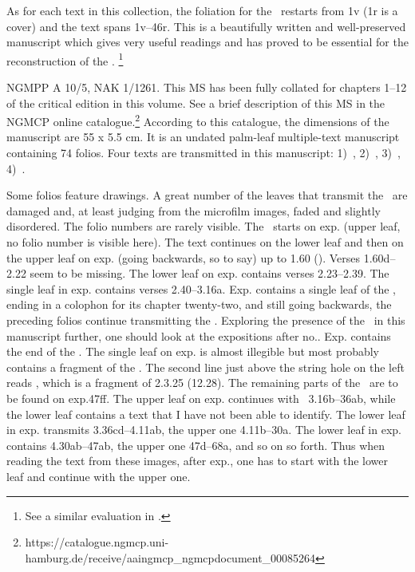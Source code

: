 As for each text in this collection, the foliation for the
\VSS\ restarts from \fol1v (\fol1r is a cover) and the text
spans \fols1v--46r. This is a beautifully written and well-preserved
manuscript which gives very useful readings and has proved to be
essential for the reconstruction of the \VSS.%
	\footnote{See a similar evaluation in
					.}


NGMPP A 10/5, NAK 1/1261. This MS has been fully collated 
for chapters 1--12 of the critical edition in this volume. 
See a brief description of this MS in
the NGMCP online catalogue.\footnote{https://catalogue.ngmcp.uni-hamburg.de/receive/aaingmcp\_ngmcpdocument\_00085264}
According to this catalogue, the dimensions of the manuscript are 55 x
5.5 cm. It is an undated palm-leaf multiple-text manuscript containing 74
folios. Four texts are transmitted in this manuscript: 
1)~\SDhU,
2)~\Ums,
3)~\SivaUp,
4)~\Vss.

Some folios feature drawings. 
A great number of the leaves that 
transmit the \VSS\ are damaged and, 
at least judging from the microfilm images, 
faded and slightly disordered. The folio numbers are
rarely visible. The \VSS\ starts on exp. 
(upper leaf, no folio number is visible here). 
The text continues on the lower leaf and then on the upper
leaf on exp. (going backwards, so to say) 
up to 1.60 (). 
Verses 1.60d--2.22 seem to be missing. The lower leaf on
exp. contains verses 2.23--2.39. 
The single leaf in exp. contains
verses 2.40--3.16a. Exp. contains a single leaf of the
, ending in a colophon for its chapter
twenty-two, and still going backwards, the preceding folios continue
transmitting the 
\Ums. 
Exploring the presence of
the \VSS\ in this manuscript further, 
one should look at the expositions
after no.. Exp. contains the end of the
\SivaUp. The
single leaf on exp. 
is almost illegible but most probably contains a
fragment of the 
. 
The second line just above
the string hole on the left reads  , which is a fragment of
2.3.25 (12.28). 
The remaining parts of the \VSS\
are to be found on exp.ff. 
The upper leaf on exp.\thinspace47 continues with
\VSS\ 3.16b--36ab, while the lower leaf contains a text that I have not
been able to identify. The lower leaf in exp.\thinspace48 transmits
3.36cd--4.11ab, the upper one 4.11b--30a. The lower leaf in 
exp. contains 4.30ab--47ab, 
the upper one 47d--68a, and so on so forth. Thus
when reading the text from these images, after exp., 
one has to start with the lower leaf and continue with the upper one.


